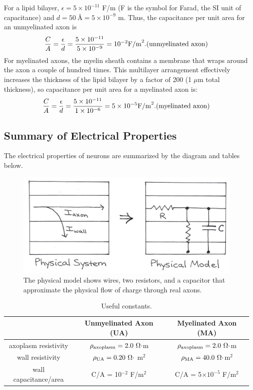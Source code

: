 For a lipid bilayer, $\epsilon = 5\times10^{-11}$ F/m (F is the symbol for Farad, the SI unit of capacitance) and $d = 50~\text{\AA} = 5\times10^{-9}$ m.  Thus, the capacitance per unit area for an unmyelinated axon is
$$\frac{C}{A}=\frac{\epsilon}{d}= \frac{5\times10^{-11}}{5\times10^{-9}}=10^{-2}{\rm F/m}^2. {\rm (unmyelinated~axon)}$$
For myelinated axons, the myelin sheath contains a membrane that wraps around the axon a couple of hundred times. This multilayer arrangement effectively increases the thickness of the lipid bilayer by a factor of 200 (1 $\mu$m total thickness), so capacitance per unit area for a myelinated axon is:
$$\frac{C}{A}=\frac{\epsilon}{d}= \frac{5\times10^{-11}}{1\times10^{-6}}=5\times10^{-5}{\rm F/m}^2. {\rm (myelinated~axon)}$$

\subsection{Summary of Electrical Properties}

The electrical properties of neurons are summarized by the diagram and tables below.
 \begin{figure}[!htb]
	\centering
	\includegraphics[width=4.5in]{./figures/Topic11/Fig11-10.jpg}
	\caption{The physical model shows wires, two resistors, and a capacitor that approximate the physical flow of charge through real axons.}
	\label{Fig11-10}
\end{figure}
\begin{table}[!h]
\begin{center}
\begin{tabular}{|c|c|c|}
\hline
 & Unmyelinated Axon (UA) & Myelinated Axon (MA)\\
\hline
axoplasm resistivity & $\rho_{\rm axoplasm} = 2.0~\Omega\cdot$m & $\rho_{\rm axoplasm} = 2.0~\Omega\cdot$m\\
wall resistivity & $\rho_{\rm UA} = 0.20~\Omega\cdot$ m$^2$ & $\rho_{\rm MA} = 40.0~\Omega\cdot$m$^2$\\
wall capacitance/area & C/A = 10$^{-2}$ F/m$^2$ & C/A = 5$\times10^{-5}$ F/m$^2$\\
\hline
\end{tabular}
\caption{Useful constants.}
\label{table11-1}
\end{center}
\end{table}


